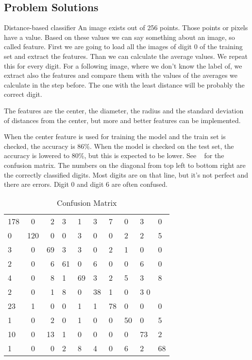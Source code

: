 \documentclass{article}
\begin{document}
\subsection{Problem Solutions}
Distance-based classifier
An image exists out of 256 points. Those points or pixels have a value. Based on these values we can say something about an image, so called feature. First we are going to load all the images of digit 0 of the training set and extract the features. Than we can calculate the average values. We repeat this for every digit. For a following image, where we don't know the label of, we extract also the features and compare them with the values of the averages we calculate in the step before. The one with the least distance will be probably the correct digit.

The features are the center, the diameter, the radius and the standard deviation of distances from the center, but more and better features can be implemented. 

When the center feature is used for training the model and the train set is checked, the accuracy is 86\%. When the model is checked on the test set, the accuracy is lowered to 80\%, but this is expected to be lower. See ~ for the confusion matrix. The numbers on the diagonal from top left to bottom right are the correctly classified digits. Most digits are on that line, but it's not perfect and there are errors. Digit 0 and digit 6 are often confused. 

\begin{table}
	\begin{tabular}{l c r}
	178 & 0 & 2 & 3 & 1 & 3 & 7 & 0 & 3 & 0 \\
	0 & 120 & 0 & 0 & 3 & 0 & 0 & 2 & 2 & 5 \\
	3 & 0 & 69 & 3 & 3 & 0 & 2 & 1 & 0 & 0 \\
	2 & 0 & 6 & 61 & 0 & 6 & 0 & 0 & 6 & 0 \\
	4 & 0 & 8 & 1 & 69 & 3 & 2 & 5 & 3 & 8 \\
	2 & 0 & 1 & 8 & 0 & 38 & 1 & 0 & 3 0 \\
	23 & 1 & 0 & 0 & 1 & 1 & 78 & 0 & 0 & 0 \\
	1 & 0 & 2 & 0 & 1 & 0 & 0 & 50 & 0 & 5 \\
	10 & 0 & 13 & 1 & 0 & 0 & 0 & 0 & 73 & 2 \\
	1 & 0 & 0 & 2 & 8 & 4 & 0 & 6 & 2 & 68 \\
	\end{tabular}
	\caption{Confusion Matrix}
	\label{tab:cm}
\end{table}
\end{document}
